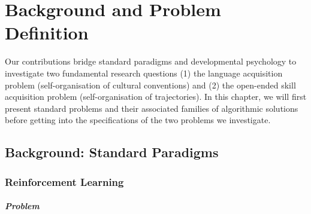 \chapter{Background and Problem Definition}
\label{chap:backgroud}
\adjustmtc
\minitoc

Our contributions bridge standard \ai paradigms and developmental psychology to investigate two fundamental research questions  (1) the language acquisition problem (self-organisation of cultural conventions) and (2) the open-ended skill acquisition problem (self-organisation of trajectories). In this chapter, we will first present standard \ai problems and their associated families of algorithmic solutions before getting into the specifications of the two problems we investigate.

\section{Background: Standard \ai Paradigms}



\subsection{Reinforcement Learning}

\label{sec:background_rl}

\paragraph{Problem}

